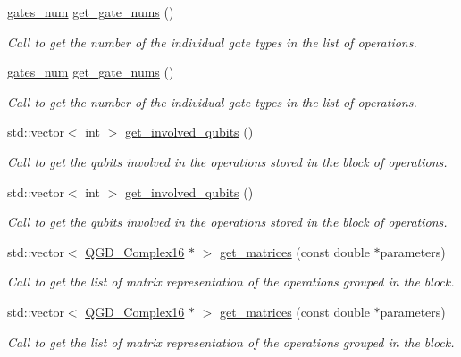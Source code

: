 \begin{DoxyCompactItemize}
\hyperlink{structgates__num}{gates\+\_\+num} \hyperlink{class_operation__block_ac39ab782da3e34c8ec4acf6181fbc5f7}{get\+\_\+gate\+\_\+nums} ()
\begin{DoxyCompactList}\small\item\em Call to get the number of the individual gate types in the list of operations. \end{DoxyCompactList}\item 
\hyperlink{structgates__num}{gates\+\_\+num} \hyperlink{class_operation__block_ac39ab782da3e34c8ec4acf6181fbc5f7}{get\+\_\+gate\+\_\+nums} ()
\begin{DoxyCompactList}\small\item\em Call to get the number of the individual gate types in the list of operations. \end{DoxyCompactList}\item 
std\+::vector$<$ int $>$ \hyperlink{class_operation__block_a92e4f0566e4b36830652729377a8e936}{get\+\_\+involved\+\_\+qubits} ()
\begin{DoxyCompactList}\small\item\em Call to get the qubits involved in the operations stored in the block of operations. \end{DoxyCompactList}\item 
std\+::vector$<$ int $>$ \hyperlink{class_operation__block_aebdbb71e02ff6826d967d55f4cd4db28}{get\+\_\+involved\+\_\+qubits} ()
\begin{DoxyCompactList}\small\item\em Call to get the qubits involved in the operations stored in the block of operations. \end{DoxyCompactList}\item 
std\+::vector$<$ \hyperlink{struct_q_g_d___complex16}{Q\+G\+D\+\_\+\+Complex16} $\ast$ $>$ \hyperlink{class_operation__block_aedddbc5242eab7c00125359a835ac53d}{get\+\_\+matrices} (const double $\ast$parameters)
\begin{DoxyCompactList}\small\item\em Call to get the list of matrix representation of the operations grouped in the block. \end{DoxyCompactList}\item 
std\+::vector$<$ \hyperlink{struct_q_g_d___complex16}{Q\+G\+D\+\_\+\+Complex16} $\ast$ $>$ \hyperlink{class_operation__block_af3e794fd9a409978a414af539ad23320}{get\+\_\+matrices} (const double $\ast$parameters)
\begin{DoxyCompactList}\small\item\em Call to get the list of matrix representation of the operations grouped in the block. \end{DoxyCompactList}\item 

\end{DoxyCompactItemize}
